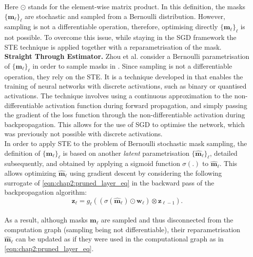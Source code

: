 Here $\odot$ stands for the element-wise matrix product. In this definition, the
masks $\{\bm{m}_\ell\}_\ell$ are stochastic and sampled from a Bernoulli
distribution. However, sampling is not a differentiable operation, therefore,
optimising directly $\{{\bm{m}_\ell}\}_\ell$ is not possible. To overcome this
issue, while staying in the \ac{SGD} framework the \acf{STE} technique is
applied together with a reparametrisation of the mask.\\

\noindent\textbf{Straight Through Estimator.} Zhou et
al. \cite{DBLP:conf/nips/ZhouLLY19} consider a Bernoulli parametrisation of
$\{\bm{m}_\ell\}_\ell$ in order to sample masks in
. Since sampling is not a differentiable
operation, they rely on the \ac{STE}. It is a technique developed in
\cite{DBLP:journals/corr/BengioLC13} that enables the training of neural
networks with discrete activations, such as binary or quantised activations. The
technique involves using a continuous approximation to the non-differentiable
activation function during forward propagation, and simply passing the gradient
of the loss function through the non-differentiable activation during
backpropagation. This allows for the use of \ac{SGD} to optimise the network,
which was previously not possible with discrete activations. \\

In order to apply \ac{STE} to the problem of Bernoulli stochastic mask
sampling, the definition of $\{\bm{m}_\ell\}_\ell$ is based on another
{\it latent} parametrisation $\{\bm{\hat{m}}_\ell\}_\ell$, detailed
subsequently, and obtained by applying a sigmoid function $\sigma(.)$ to
$\bm{\hat{m}}_\ell$. This allows optimizing $\bm{\hat{m}}_\ell$  using gradient
descent by considering the following surrogate of
\cref{eqn:chap2:pruned_layer_eq} in the backward pass of the backpropagation
algorithm:\\

\begin{equation}
  \label{eqn:chap2:pruned_layer_eq2}
  \mathbf{z}_{\ell} = g_\ell( ( \sigma(\bm{\hat{m}}_\ell) \odot \bm{w}_\ell ) \otimes \mathbf{z}_{\ell-1} ).
\end{equation} \\

\noindent As a result, although masks $\bm{m}_\ell$ are sampled and thus
disconnected from the computation graph (sampling being not differentiable),
their reparametrisation $\bm{\hat{m}}_\ell$ can be updated as if they were used in
the computational graph as in \cref{eqn:chap2:pruned_layer_eq}.\\


